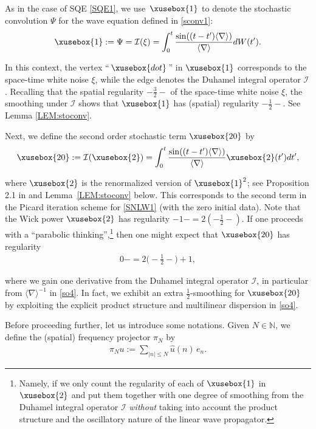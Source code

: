 \documentclass[%
11pt,  reqno]{amsart}
\def\<#1>{\xusebox{#1}}
\newcommand{\1}{\hspace{0.2mm}\text{I}\hspace{0.2mm}}
\newcommand{\noi}{\noindent}
\newcommand{\nb}{\nabla}
\newcommand{\ft}{\widehat}
\newcommand{\jb}[1]
{\langle #1 \rangle}
\newcommand{\N}{\mathbb{N}}
\newcommand{\I}{\mathcal{I}}
\numberwithin{equation}{section}
\numberwithin{theorem}{section}
\begin{document}
As in the case of  SQE \eqref{SQE1}, 
 we use~$\<1>$
to denote the stochastic convolution $\Psi$ for the wave equation defined in \eqref{sconv1}:
\begin{align}
 \<1> : = 
 \Psi = \I  (\xi)
  =  \int_{0}^t \frac{\sin ((t-t')\jb{\nb})}{\jb{\nb}}dW(t').
\label{so3}
\end{align}




\noi
In this context, 
the vertex ``\,$\<dot>$\,'' in $\<1>$ corresponds to the space-time white noise $\xi$,
while the edge denotes the Duhamel integral operator $\I$.
Recalling that the spatial regularity $-\frac 32 -$ of the space-time white noise $\xi$, 
the smoothing under $\I$ 
shows that 
 $\<1>$ has (spatial) regularity $- \frac 12-$.  See Lemma \ref{LEM:stoconv}.

Next, we define the second order stochastic term $\<20>$ by 
\begin{align}
  \<20> := 
   \I (\<2>)
  =  \int_{0}^t \frac{\sin ((t-t')\jb{\nb})}{\jb{\nb}}\<2>(t') dt', 
\label{so4}
\end{align}

\noi
where $\<2>$ is the renormalized version of $\<1>^2$;
see Proposition 2.1 in \cite{GKO}
and Lemma~\ref{LEM:stoconv} below.
This corresponds to the second term in the Picard iteration scheme for \eqref{SNLW1}
(with the zero initial data).
Note that the Wick power $\<2>$ has regularity $-1- = 2(-\frac{1}{2}-)$.
If one proceeds with a ``parabolic thinking'',\footnote{Namely, 
if we only count the regularity of each of $\<1>$ in $\<2>$
and put them together with one degree of smoothing
from the Duhamel integral operator $\I$ {\it without} taking into account the product structure
and the oscillatory nature of the linear wave propagator.}
then one might expect that $\<20>$ has
regularity 
\begin{align}
0- = 2\big(-\tfrac 12 -\big) + 1,
\label{naive1}
\end{align}

\noi
where we gain one derivative from the Duhamel integral operator $\I$, 
in particular from $\jb{\nb}^{-1}$ in \eqref{so4}.
In fact, we exhibit  an extra $\frac 12$-smoothing
for $ \<20>$  
by exploiting the explicit product structure
and multilinear dispersion 
 in \eqref{so4}.


Before proceeding further, let us introduce some notations.
Given $N \in \N$, we define the (spatial) frequency projector $\pi_N$  by 
\begin{align}
\pi_N u := 
\sum_{ |n| \leq N}  \ft u (n)  \, e_n.
\label{pi}
\end{align}
\end{document}
